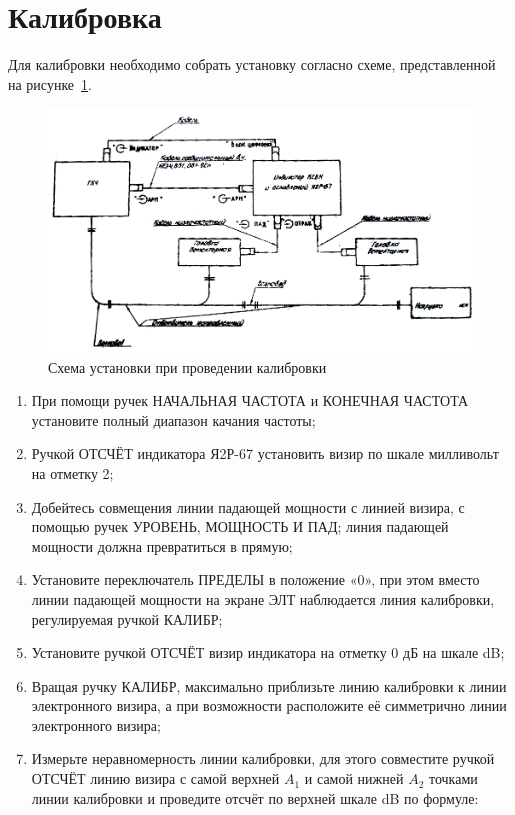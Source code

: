 \documentclass[a4paper]{hedwork}
\begin{document}
    \section{Калибровка}
        Для калибровки необходимо собрать установку согласно схеме, представленной на рисунке~\ref{cal}.
        
        \begin{figure}[h!]
            \center
            \includegraphics[width=.6\textwidth]{1}
            \caption{Схема установки при проведении калибровки}
            \label{cal}
        \end{figure}
        
        \begin{enumerate}
            \item При помощи ручек НАЧАЛЬНАЯ ЧАСТОТА и КОНЕЧНАЯ ЧАСТОТА
                установите полный диапазон качания частоты;
            \item Ручкой ОТСЧЁТ индикатора Я2Р-67 установить визир по шкале
                милливольт на отметку 2;
            \item Добейтесь совмещения линии падающей мощности с линией визира,
                с помощью ручек УРОВЕНЬ, МОЩНОСТЬ И ПАД; линия падающей мощности
                должна превратиться в прямую;
            \item Установите переключатель ПРЕДЕЛЫ в положение «0», при этом
                вместо линии падающей мощности на экране ЭЛТ наблюдается линия
                калибровки, регулируемая ручкой КАЛИБР;
            \item Установите ручкой ОТСЧЁТ визир индикатора на отметку 0 дБ
                на шкале dB;
            \item Вращая ручку КАЛИБР, максимально приблизьте линию калибровки
                к линии электронного визира, а при возможности расположите её
                симметрично линии электронного визира;
            \item Измерьте неравномерность линии калибровки, для этого
                совместите ручкой ОТСЧЁТ линию визира с самой верхней \( A_1 \)
                и самой нижней \( A_2 \) точками линии калибровки и проведите
                отсчёт по верхней шкале dB по формуле:
        \end{enumerate}
\end{document}
